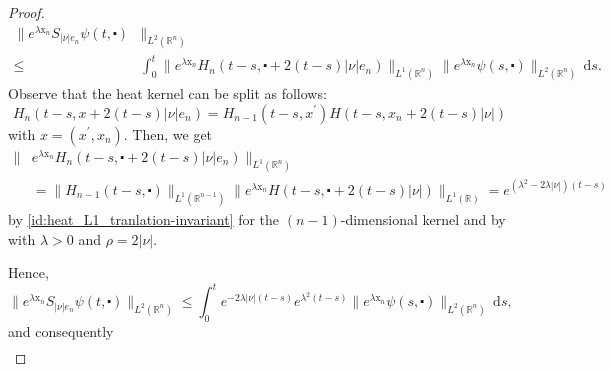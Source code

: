 \documentclass[10pt,a4paper]{amsart}
\theoremstyle{remark}
\theoremstyle{definition}
\newcommand{\R}{\mathbb{R}}
\newcommand{\dd}{\mathrm{d}}
\newcommand{\tm}{\mathrm{t}}
\newcommand{\x}{\mathrm{x}}
\begin{document}
\begin{proof}
\begin{align*}
\| e^{\lambda  \x_n} S_{|\nu| e_n} \psi (t, \centerdot) & \|_{L^2(\R^n)} \\
\leq & \int_0^t \| e^{\lambda \x_n} H_n (t-s, \centerdot + 2(t-s) |\nu| e_n)\|_{L^1(\R^n)} \| e^{\lambda \x_n} \psi(s, \centerdot)\|_{L^2(\R^n)} \, \dd s.
\end{align*}
Observe that the heat kernel can be split as follows:
\[H_n (t-s, x + 2(t-s) |\nu| e_n) = H_{n-1} (t-s, x^\prime) H (t-s, x_n + 2(t-s) |\nu|)\]
with $x = (x^\prime, x_n)$.
Then, we get
\begin{align*}
\| & e^{\lambda \x_n} H_n (t-s, \centerdot + 2(t-s) |\nu| e_n)\|_{L^1(\R^n)} \\
& = \|H_{n-1} (t-s, \centerdot)\|_{L^1(\R^{n-1})} \|e^{\lambda \x_n} H (t-s, \centerdot + 2(t-s) |\nu|)\|_{L^1(\R)} = e^{(\lambda^2-2\lambda|\nu|)(t-s)}
\end{align*}
by \eqref{id:heat_L1_tranlation-invariant} for the $(n-1)$-dimensional kernel and by
 with $\lambda > 0$ and $\rho = 2 |\nu|$.
%
%
%

%
%
%
Hence,
\[ \| e^{\lambda  \x_n} S_{|\nu| e_n} \psi (t, \centerdot) \|_{L^2(\R^n)} \leq \int_0^t e^{-2\lambda|\nu|(t-s)} e^{\lambda^2(t-s)}  \| e^{\lambda \x_n} \psi(s, \centerdot)\|_{L^2(\R^n)} \, \dd s,  \]
and consequently
\begin{align*}

\end{align*}
\end{proof}
\end{document}
